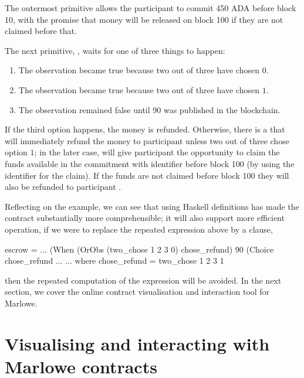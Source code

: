 \documentclass[runningheads]{llncs}
\begin{document}
The outermost primitive  allows the participant  to commit 450 ADA before 
block 10, with the promise that money will be released on block 100 if they are not claimed before that.

The next primitive, , waits for one of three things to happen:
\begin{enumerate}
 \item The observation became true because two out of three have chosen $0$. 
 \item The observation became true because two out of three have chosen $1$.
 \item The observation remained false until 90 was published in the blockchain.
\end{enumerate}

If the third option happens, the money is refunded. Otherwise, there is a  that will 
immediately refund the money to participant  unless two out of three chose option $1$; in the later 
case,  will give participant  the opportunity to claim the funds available in 
the commitment with identifier  before block 100 (by using the identifier  for 
the claim). If the funds are not claimed before block 100 they will also be refunded to 
participant .

Reflecting on the example, we can see that using Haskell definitions has made the contract substantially more 
comprehensible; it will also support more efficient operation, if we were to replace the repeated  expression 
 above by a  clause, 
\begin{haskellcode}
escrow = ...        (When (OrObs (two_chose 1 2 3 0)
                                 chose_refund)
                          90
                          (Choice chose_refund ...
                           ...
         where chose_refund = two_chose 1 2 3 1                 
\end{haskellcode}
then the repeated computation of the expression will be avoided.
In the next section, we cover the online contract visualisation and interaction tool for Marlowe.

\section{Visualising and interacting with Marlowe contracts}
\end{document}
